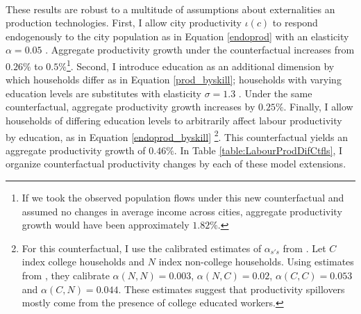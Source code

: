 \documentclass[12pt]{article}
\begin{document}
\paragraph*{}
These results are robust to a multitude of assumptions about externalities an production technologies. First, I allow city productivity $\iota(c)$ to respond endogenously to the city population as in Equation \eqref{endoprod} with an elasticity $\alpha = 0.05$ \citep{Combes_review}. Aggregate productivity growth under the counterfactual increases from $0.26 \%$ to $0.5 \%$\footnote{If we took the observed population flows under this new counterfactual and assumed no changes in average income across cities, aggregate productivity growth would have been approximately $1.82\%$.}. Second, I introduce education as an additional dimension by which households differ as in Equation \eqref{prod_byskill}; households with varying education levels are substitutes with elasticity $\sigma = 1.3$ \citep{card}. Under the same counterfactual, aggregate productivity growth increases by $0.25 \%$. Finally, I allow households of differing education levels to arbitrarily affect labour productivity by education, as in Equation \eqref{endoprod_byskill} \citep{diamond2016}\footnote{For this counterfactual, I use the calibrated estimates of $\alpha_{s's}$ from \cite{efficiency}. Let $C$ index college households and $N$ index non-college households. Using estimates from \cite{diamond2016}, they calibrate $\alpha(N, N) = 0.003$, $\alpha(N, C) = 0.02$, $\alpha(C, C) = 0.053$ and $\alpha(C, N) = 0.044$. These estimates suggest that productivity spillovers mostly come from the presence of college educated workers.}. This counterfactual yields an aggregate productivity growth of $0.46 \%$. In Table \ref{table:LabourProdDifCtfls}, I organize counterfactual productivity changes by each of these model extensions.
\end{document}
